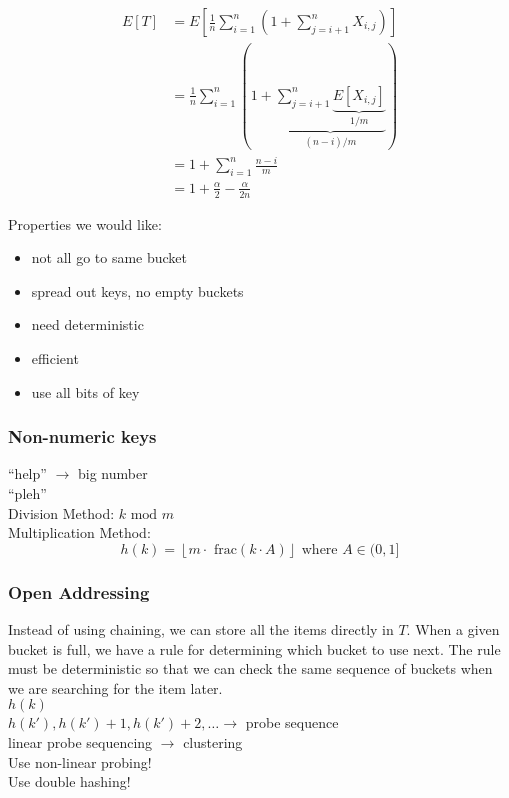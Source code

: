 \begin{equation*}
\begin{split}
E[T] & = E \left [ \frac{1}{n} \sum_{i=1}^{n} \left (1 + \sum_{j=i+1}^{n} X_{i,j} \right ) \right ] \\
& = \frac{1}{n} \sum_{i=1}^n \left (1 + \underbrace{\sum_{j=i+1}^n \underbrace{E[X_{i,j}]}_{1/m}}_{(n-i)/m} \right ) \\
& = 1 + \sum_{i=1}^n \frac{n-i}{m} \\
& = 1 + \frac{\alpha}{2} - \frac{\alpha}{2n}
\end{split}
\end{equation*}

\noindent Properties we would like:
\begin{itemize}
	\item not all go to same bucket
	\item spread out keys, no empty buckets
	\item need deterministic
	\item efficient
	\item use all bits of key
\end{itemize}

\subsubsection*{Non-numeric keys}

``help'' $\rightarrow$ big number\\
``pleh'' \\

\noindent Division Method: $k \textrm{ mod }m$ \\
Multiplication Method: \\
$$ h(k) = \left \lfloor m \cdot \textrm{ frac}(k\cdot A) \right \rfloor \textrm{ where }A \in (0,1]$$

\subsubsection*{Open Addressing}

\noindent Instead of using chaining, we can store all the items directly in $T$. When a given bucket is full, we have a rule for determining which bucket to use next. The rule must be deterministic so that we can check the same sequence of buckets when we are searching for the item later. \\

\noindent $h(k)$ \\
$h(k'), h(k') + 1, h(k') + 2, \ldots \rightarrow$ probe sequence \\
linear probe sequencing $\rightarrow$ clustering \\
Use non-linear probing! \\
Use double hashing! \\

